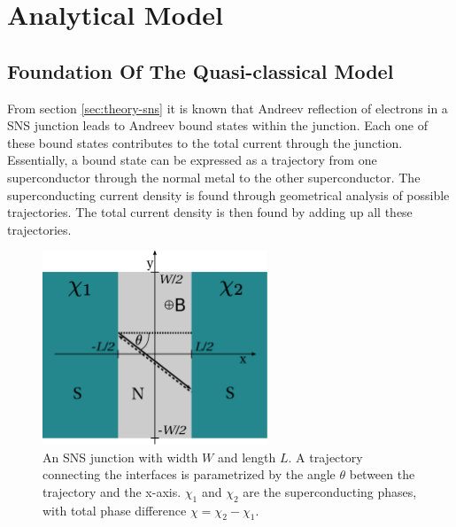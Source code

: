\chapter{Analytical Model}
\label{ch:analyticalmodel}

\section{Foundation Of The Quasi-classical Model}
From section \ref{sec:theory-sns} it is known that Andreev reflection of electrons in a SNS junction leads to Andreev bound states within the junction. Each one of these bound states contributes to the total current through the junction. Essentially, a bound state can be expressed as a trajectory from one superconductor through the normal metal to the other superconductor. The superconducting current density is found through geometrical analysis of possible trajectories. The total current density is then found by adding up all these trajectories.
\begin{figure}[h]
\centering	
\includegraphics[width=0.6\textwidth]{figure/analyticalmodel/sns_junction_csch}
\caption{An SNS junction with width $W$ and length $L$. A trajectory connecting the interfaces is parametrized by the angle $\theta$ between the trajectory and the x-axis. $\chi_1$ and $\chi_2$ are the superconducting phases, with total phase difference $\chi = \chi_2 - \chi_1$.}
\label{fig:sns_schematic}
\end{figure}
